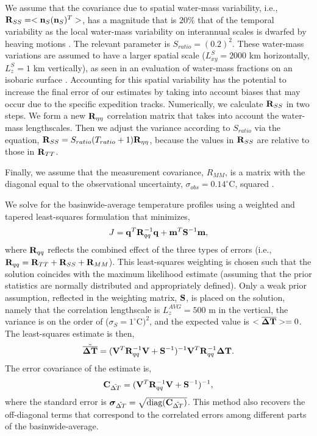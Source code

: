 \documentclass[12pt]{article}
\begin{document}
We assume that the covariance due to spatial water-mass variability,
i.e., ${\bf R}_{SS} =<{\bf n}_S ({\bf n}_S)^T>$, has a magnitude that
is $20\%$ that of the temporal variability as the local water-mass
variability on interannual scales is dwarfed by heaving motions
\cite{Huang--2015:Heaving}. The relevant parameter is
$S_{ratio} = (0.2)^2$. These water-mass variations are assumed to have
a larger spatial scale ($L_{xy}^S = 2000$ km horizontally, $L_z^S = 1$
km vertically), as seen in an evaluation of water-mass fractions on an
isobaric surface \cite{Gebbie-Huybers-2010:Total}. Accounting for this
spatial variability has the potential to increase the final error of
our estimates by taking into account biases that may occur due to the
specific expedition tracks. Numerically, we calculate ${\bf R}_{SS}$
in two steps. We form a new ${\bf R}_{\eta\eta}$ correlation matrix
that takes into account the water-mass lengthscales. Then we adjust
the variance according to $S_{ratio}$ via the equation,
${\bf R}_{SS} = S_{ratio} (T_{ratio} + 1){\bf R}_{\eta\eta}$, because
the values in ${\bf R}_{SS}$ are relative to those in ${\bf R}_{TT}$.

Finally, we assume that the measurement
covariance, ${R_{MM}}$, is a matrix with the diagonal equal to the
observational uncertainty, $\sigma_{obs} = 0.14^{\circ}$C, squared
\cite{Roemmich-Gould-2012:135}.

We solve for the basinwide-average temperature profiles using a
weighted and tapered least-squares formulation that minimizes, 
\begin{equation}
\label{eq:qWq}
J = {\bf q}^T {\bf R}_{qq}^{-1} {\bf q} + {\bf m}^T {\bf S}^{-1} {\bf m},
\end{equation}  
where ${\bf R}_{qq}$ reflects the combined effect of the three types
of errors (i.e.,
${\bf R}_{qq} = {\bf R}_{TT} + {\bf R}_{SS} + {\bf R}_{MM}$). This
least-squares weighting %
is chosen such that the solution coincides with the maximum likelihood
estimate (assuming that the prior statistics are normally distributed
and appropriately defined).  Only a weak prior assumption, reflected
in the weighting matrix, ${\bf S}$, is placed on the solution, namely
that the correlation lengthscale is $L_z^{AVG} = 500$ m in the
vertical, the variance is on the order of ($\sigma_S = 1^\circ$C$)^2$,
and the expected value is
$<\overline{{\boldsymbol \Delta}{\bf T}}>=0$.  The least-squares
estimate is then,
\begin{equation}
\tilde{\overline{{\boldsymbol \Delta}{\bf T}}} = ({\bf V}^T {\bf R}_{qq}^{-1} {\bf V} + {\bf S}^{-1} )^{-1} {\bf V}^T {\bf R}_{qq}^{-1} {\boldsymbol \Delta}{\bf T}.
\end{equation}
 The error covariance of the estimate is,
\begin{equation}
  \label{eq:covariance17}
  \mbox{{\bf C}}_{{\tilde{\Delta T}}} = ({\bf V}^T {\bf R}_{qq}^{-1} {\bf V} + {\bf S}^{-1} )^{-1},
\end{equation}
where the standard error is
${\boldsymbol \sigma}_{\tilde{\Delta T}} =
\sqrt{\mbox{diag}(\mbox{{\bf C}}_{{\tilde{\Delta T}}})}$.  This method
also recovers the off-diagonal terms that correspond to the correlated
errors among different parts of the basinwide-average.
\end{document}

